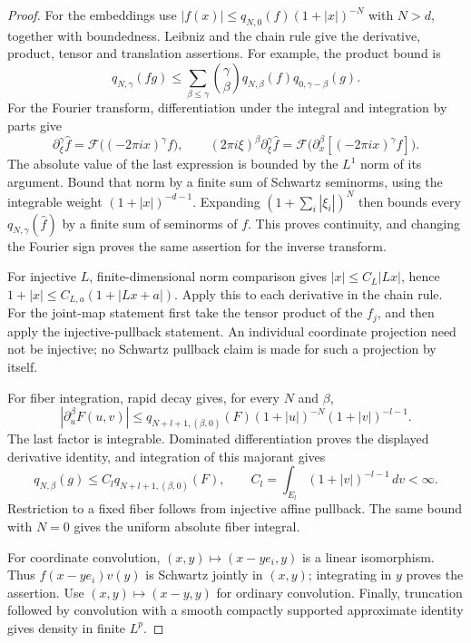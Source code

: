 \documentclass[12pt,reqno]{amsart}
\theoremstyle{plain}
\theoremstyle{definition}
\theoremstyle{remark}
\numberwithin{equation}{section}
\newcommand{\F}{\mathcal F}
\newcommand{\dd}{\,d}
\begin{document}
\begin{proof}
For the embeddings use $|f(x)|\le q_{N,0}(f)(1+|x|)^{-N}$ with
$N>d$, together with boundedness. Leibniz and the chain rule give
the derivative, product, tensor and translation assertions.
For example, the product bound is
\[
 q_{N,\gamma}(fg)\le
 \sum_{\beta\le\gamma}\binom{\gamma}{\beta}
        q_{N,\beta}(f)q_{0,\gamma-\beta}(g).
\]
For the Fourier transform, differentiation under the integral and
integration by parts give
\[
 \partial_\xi^\gamma\widehat f
       =\F\big((-2\pi ix)^\gamma f\big),\qquad
 (2\pi i\xi)^\beta\partial_\xi^\gamma\widehat f
       =\F\big(\partial_x^\beta[(-2\pi ix)^\gamma f]\big).
\]
The absolute value of the last expression is bounded by the $L^1$
norm of its argument. Bound that norm by a finite sum of Schwartz
seminorms, using the integrable weight $(1+|x|)^{-d-1}$.
Expanding $(1+\sum_i|\xi_i|)^N$ then bounds every
$q_{N,\gamma}(\widehat f)$ by a finite sum of seminorms of $f$.
This proves continuity, and changing the Fourier sign proves the
same assertion for the inverse transform.

For injective $L$, finite-dimensional norm comparison gives
$|x|\le C_L|Lx|$, hence
$1+|x|\le C_{L,a}(1+|Lx+a|)$. Apply this to each derivative in
the chain rule. For the joint-map statement first take the tensor
product of the $f_j$, and then apply the injective-pullback statement.
An individual coordinate projection need not be injective; no
Schwartz pullback claim is made for such a projection by itself.

For fiber integration, rapid decay gives, for every $N$ and $\beta$,
\[
 |\partial_u^\beta F(u,v)|
       \le q_{N+l+1,(\beta,0)}(F)
                     (1+|u|)^{-N}(1+|v|)^{-l-1}.
\]
The last factor is integrable. Dominated differentiation proves the
displayed derivative identity, and integration of this majorant gives
\[
 q_{N,\beta}(g)\le C_lq_{N+l+1,(\beta,0)}(F),\qquad
 C_l=\int_{E_l}(1+|v|)^{-l-1}\dd v<\infty.
\]
Restriction to a fixed fiber follows from injective affine pullback.
The same bound with $N=0$ gives the uniform absolute fiber integral.

For coordinate convolution, $(x,y)\mapsto(x-ye_i,y)$ is a linear
isomorphism. Thus $f(x-ye_i)v(y)$ is Schwartz jointly in $(x,y)$;
integrating in $y$ proves the assertion. Use
$(x,y)\mapsto(x-y,y)$ for ordinary convolution.
Finally, truncation followed by convolution with a smooth compactly
supported approximate identity gives density in finite $L^p$.
\end{proof}
\end{document}
